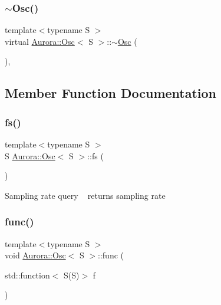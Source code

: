 \subsubsection{\texorpdfstring{$\sim$\+Osc()}{~Osc()}}
{\footnotesize\ttfamily template$<$typename S $>$ \\
virtual \hyperlink{class_aurora_1_1_osc}{Aurora\+::\+Osc}$<$ S $>$\+::$\sim$\hyperlink{class_aurora_1_1_osc}{Osc} (\begin{DoxyParamCaption}{ }\end{DoxyParamCaption})\hspace{0.3cm}{\ttfamily [inline]}, {\ttfamily [virtual]}}



\subsection{Member Function Documentation}
\mbox{\label{class_aurora_1_1_osc_a0a156f9d14f246ea4e7b1cf2bcbf2c4c}} 
\subsubsection{\texorpdfstring{fs()}{fs()}}
{\footnotesize\ttfamily template$<$typename S $>$ \\
S \hyperlink{class_aurora_1_1_osc}{Aurora\+::\+Osc}$<$ S $>$\+::fs (\begin{DoxyParamCaption}{ }\end{DoxyParamCaption})\hspace{0.3cm}{\ttfamily [inline]}}

Sampling rate query ~\newline
returns sampling rate \mbox{\label{class_aurora_1_1_osc_a1ffdfa0db8932dbaa7cc96e046a6d461}} 
\subsubsection{\texorpdfstring{func()}{func()}}
{\footnotesize\ttfamily template$<$typename S $>$ \\
void \hyperlink{class_aurora_1_1_osc}{Aurora\+::\+Osc}$<$ S $>$\+::func (\begin{DoxyParamCaption}\item[{std\+::function$<$ S(S)$>$}]{f }\end{DoxyParamCaption})\hspace{0.3cm}{\ttfamily [inline]}}

